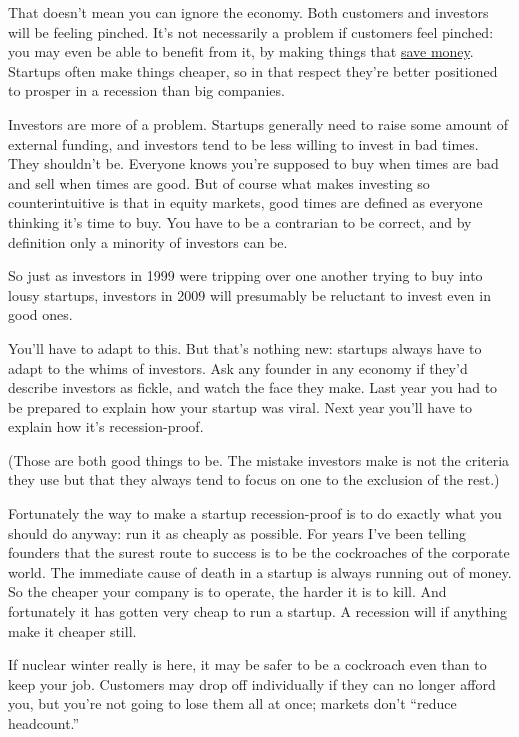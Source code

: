 That doesn't mean you can ignore the economy. Both customers and
investors will be feeling pinched. It's not necessarily a problem if
customers feel pinched: you may even be able to benefit from it, by
making things that \href{http://bountii.com}{save money}. Startups often
make things cheaper, so in that respect they're better positioned to
prosper in a recession than big companies.

Investors are more of a problem. Startups generally need to raise some
amount of external funding, and investors tend to be less willing to
invest in bad times. They shouldn't be. Everyone knows you're supposed
to buy when times are bad and sell when times are good. But of course
what makes investing so counterintuitive is that in equity markets, good
times are defined as everyone thinking it's time to buy. You have to be
a contrarian to be correct, and by definition only a minority of
investors can be.

So just as investors in 1999 were tripping over one another trying to
buy into lousy startups, investors in 2009 will presumably be reluctant
to invest even in good ones.

You'll have to adapt to this. But that's nothing new: startups always
have to adapt to the whims of investors. Ask any founder in any economy
if they'd describe investors as fickle, and watch the face they make.
Last year you had to be prepared to explain how your startup was viral.
Next year you'll have to explain how it's recession-proof.

(Those are both good things to be. The mistake investors make is not the
criteria they use but that they always tend to focus on one to the
exclusion of the rest.)

Fortunately the way to make a startup recession-proof is to do exactly
what you should do anyway: run it as cheaply as possible. For years I've
been telling founders that the surest route to success is to be the
cockroaches of the corporate world. The immediate cause of death in a
startup is always running out of money. So the cheaper your company is
to operate, the harder it is to kill. And fortunately it has gotten very
cheap to run a startup. A recession will if anything make it cheaper
still.

If nuclear winter really is here, it may be safer to be a cockroach even
than to keep your job. Customers may drop off individually if they can
no longer afford you, but you're not going to lose them all at once;
markets don't ``reduce headcount.''

